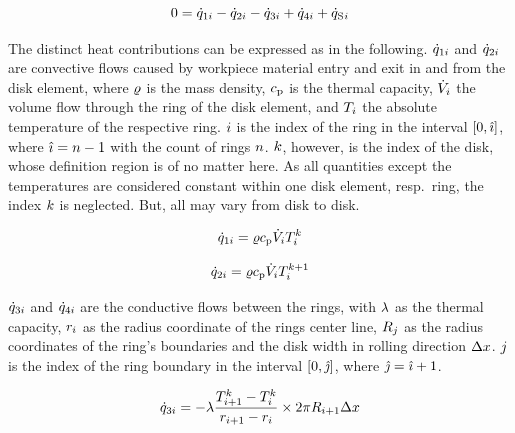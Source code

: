 \documentclass{scrartcl}
\begin{document}
    \begin{equation}
        0 = {\dot{q}}_{1{i}} - {\dot{q}}_{2{i}} - {\dot{q}}_{3{i}} + {\dot{q}}_{4{i}} + {\dot{q}_\mathrm{S}}{}_{{i}}
        \label{eq:heat_flow_balance}
    \end{equation}

    The distinct heat contributions can be expressed as in the following.
    ${\dot{q}}_{1{i}}$ and ${\dot{q}}_{2{i}}$ are convective flows caused by workpiece material entry and exit in and from the disk element, where ${\varrho}$ is the mass density, ${c_\mathrm{p}}$ is the thermal capacity, ${\dot{V}}_{i}$ the volume flow through the ring of the disk element, and ${T}_{i}$ the absolute temperature of the respective ring.
    ${i}$ is the index of the ring in the interval $[0, {\hat{\imath}}]$, where ${\hat{\imath}} = {n} - 1$ with the count of rings ${n}$.
    ${k}$, however, is the index of the disk, whose definition region is of no matter here.
    As all quantities except the temperatures are considered constant within one disk element, resp.\ ring, the index ${k}$ is neglected.
    But, all may vary from disk to disk.

    \begin{equation}
        {\dot{q}}_{1{i}} = {\varrho} {c_\mathrm{p}} {\dot{V}}_{i} {T}_{{i}}^{{k}}
        \label{eq:heat_flow_1}
    \end{equation}

    \begin{equation}
        {\dot{q}}_{2{i}} = {\varrho} {c_\mathrm{p}} {\dot{V}}_{i} {T}_{{i}}^{{k}+1}
        \label{eq:heat_flow_2}
    \end{equation}

    ${\dot{q}}_{3{i}}$ and ${\dot{q}}_{4{i}}$ are the conductive flows between the rings, with ${\lambda}$ as the thermal capacity, ${r}_{i}$ as the radius coordinate of the rings center line, ${R}_{j}$ as the radius coordinates of the ring's boundaries and the disk width in rolling direction ${\Delta x}$.
    ${j}$ is the index of the ring boundary in the interval $[0, {\hat{\jmath}}]$, where ${\hat{\jmath}} = {\hat{\imath}} + 1$.

    \begin{equation}
        {\dot{q}}_{3{i}} = -{\lambda} \frac{{T}_{{i}+1}^{{k}}-{T}_{{i}}^{{k}}}{{r}_{{i}+1} - {r}_{{i}}} \times 2 \pi {R}_{{i}+1} {\Delta x}
        \label{eq:heat_flow_3}
    \end{equation}
\end{document}
